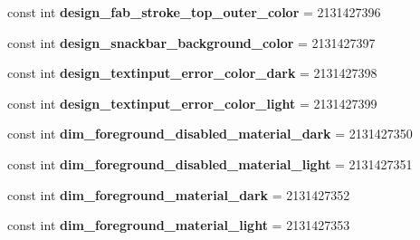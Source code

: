 \begin{DoxyCompactItemize}
\mbox{\label{class_sample_app_1_1_droid_1_1_resource_1_1_color_a86db340972e65e983e16fd89ba030c6d}} 
const int {\bfseries design\+\_\+fab\+\_\+stroke\+\_\+top\+\_\+outer\+\_\+color} = 2131427396
\item 
\mbox{\label{class_sample_app_1_1_droid_1_1_resource_1_1_color_ae58439a2296e0c4640dbdd295ea5faf7}} 
const int {\bfseries design\+\_\+snackbar\+\_\+background\+\_\+color} = 2131427397
\item 
\mbox{\label{class_sample_app_1_1_droid_1_1_resource_1_1_color_a2a8bfe45784ca38dd08925e236fd60b3}} 
const int {\bfseries design\+\_\+textinput\+\_\+error\+\_\+color\+\_\+dark} = 2131427398
\item 
\mbox{\label{class_sample_app_1_1_droid_1_1_resource_1_1_color_a7433bd6753ce61c950a32e9b2052d310}} 
const int {\bfseries design\+\_\+textinput\+\_\+error\+\_\+color\+\_\+light} = 2131427399
\item 
\mbox{\label{class_sample_app_1_1_droid_1_1_resource_1_1_color_a7cbb108c773455b3c1f54eddb0df8de8}} 
const int {\bfseries dim\+\_\+foreground\+\_\+disabled\+\_\+material\+\_\+dark} = 2131427350
\item 
\mbox{\label{class_sample_app_1_1_droid_1_1_resource_1_1_color_a026704a2dc65e665609aef408af7f5d5}} 
const int {\bfseries dim\+\_\+foreground\+\_\+disabled\+\_\+material\+\_\+light} = 2131427351
\item 
\mbox{\label{class_sample_app_1_1_droid_1_1_resource_1_1_color_a573b056a9dbd30d191c2606ecc395899}} 
const int {\bfseries dim\+\_\+foreground\+\_\+material\+\_\+dark} = 2131427352
\item 
\mbox{\label{class_sample_app_1_1_droid_1_1_resource_1_1_color_a7c906501e33ebc5fe5d202cc65ceac21}} 
const int {\bfseries dim\+\_\+foreground\+\_\+material\+\_\+light} = 2131427353

\end{DoxyCompactItemize}
